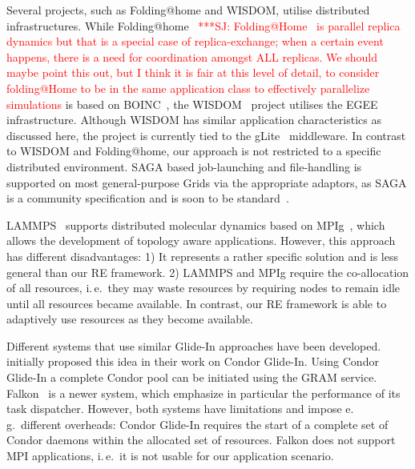 \documentclass{rspublic}
\newcommand{\jhanote}[1]{ {\textcolor{red} { ***SJ: #1 }}}
\newcommand{\jhanote}[1]{}
\newcommand{\glidein}[1]{Glide-In }
\begin{document}
{
Several projects, such as Folding@home and WISDOM, utilise distributed
infrastructures. While
Folding@home~\citep{PhysRevLett.86.4983}\jhanote{Folding@Home~\citep{PhysRevLett.86.4983}
is parallel replica dynamics but that is a special case of
replica-exchange; when a certain event happens, there is a need for
coordination amongst ALL replicas. We should maybe point this out,
but I think it is fair at this level of detail, to consider
folding@Home to be in the same application class to effectively
parallelize simulations} is based on BOINC~\citep{1033223}, the
WISDOM~\citep{wisdom} project utilises the EGEE infrastructure. 
Although WISDOM has similar application characteristics as discussed
here, the project is currently tied to the gLite~\citep{glite}
middleware.  In contrast to WISDOM and Folding@home, our approach is
not restricted to a specific distributed environment. SAGA based
job-launching and file-handling is supported on most general-purpose
Grids via the appropriate adaptors, as SAGA is a community
specification and is soon to be standard~\citep{saga_url}.       

LAMMPS~\citep{Plimpton:1995nx,1383459} supports distributed molecular
dynamics based on MPIg~\citep{Toonen:2008ao}, which allows the
development of topology aware applications. However, this approach has
different disadvantages: 1) It represents a rather specific solution
and is less general than our RE framework. 2) LAMMPS and MPIg require
the co-allocation of all resources, i.\,e.\ they may waste resources
by requiring nodes to remain idle until all resources became
available.  In contrast, our RE framework is able to adaptively use
resources as they become available.

Different systems that use similar Glide-In approaches have been
developed. \citet{citeulike:291860} initially proposed this idea in
their work on Condor Glide-In. Using Condor Glide-In a complete Condor
pool can be initiated using the GRAM service. Falkon~\citep{1362680}
is a newer system, which emphasize in particular the performance of
its task dispatcher.  However, both systems have limitations and
impose e.\,g.\ different overheads: Condor \glidein\ requires the
start of a complete set of Condor daemons within the allocated set of
resources. 
Falkon  does not support MPI applications, i.\,e.\ it is not usable for our
application scenario.  
                             
}
\end{document}
